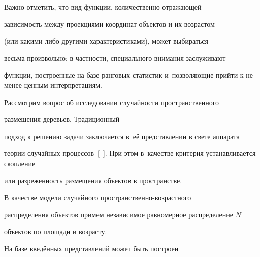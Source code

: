 






Важно отметить, что вид функции, количественно отражающей

зависимость между проекциями координат объектов и их возрастом 

(или какими-либо другими характеристиками), может выбираться 

весьма произвольно; в частности, специального внимания заслуживают 

функции, построенные на базе ранговых статистик и~позволяющие прийти к не менее ценным интерпретациям.



Рассмотрим вопрос об исследовании случайности  пространственного

размещения деревьев. Традиционный

подход к решению задачи заключается в~её представлении в свете аппарата

теории случайных процессов~[--]. При этом в~качестве критерия устанавливается скопление 

или разреженность размещения объектов в пространстве.





В качестве модели случайного про\-стран\-ствен\-но-воз\-раст\-ного 

распределения объектов примем независимое равномерное  распределение $N$ 

объектов по площади и возрасту. 



На базе введённых представлений может быть построен 

